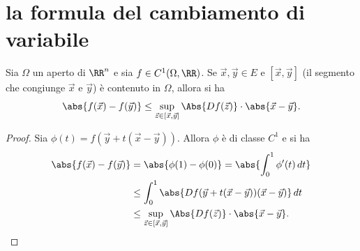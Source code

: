 
\section{la formula del cambiamento di variabile}

\begin{lemma}
  \label{lm:disuguaglianza_lagrange}
Sia $\Omega$ un aperto di $\RR^n$ e sia $f\in C^1(\Omega,\RR)$.
Se $\vec x,\vec y \in E$ e $[\vec x,\vec y]$ (il segmento che congiunge 
$\vec x$ e $\vec y$) è contenuto in $\Omega$, allora si ha
\[
  \abs{f(\vec x) - f(\vec y)} \le \sup_{\vec z \in [\vec x,\vec y]} \Abs{Df(\vec z)}\cdot\abs{\vec x - \vec y}.
\]
\end{lemma}
\begin{proof}
Sia $\phi(t) = f(\vec y + t(\vec x - \vec y))$.
Allora $\phi$ è di classe $C^1$ e si ha
\begin{align*}
\abs{f(\vec x) - f(\vec y)}
&= \abs{\phi(1) - \phi(0)}
= \abs{\int_0^1 \phi'(t)\, dt}\\
& \le \int_0^1 \abs{Df(\vec y + t(\vec x - \vec y))(\vec x - \vec y)}\, dt \\
& \le \sup_{\vec z \in [\vec x,\vec y]} \Abs{Df(\vec z)}\cdot \abs{\vec x - \vec y}.
\end{align*}
\end{proof}

